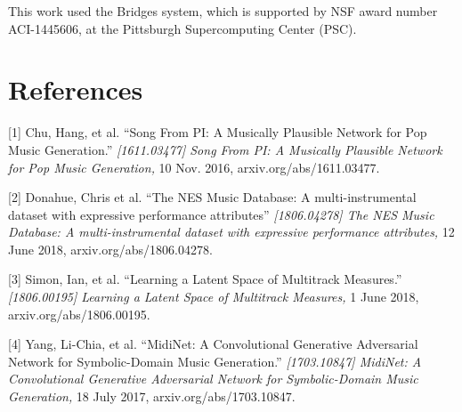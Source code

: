\documentclass{article}
\begin{document}
This work used the Bridges system, which is supported by NSF award number ACI-1445606, at the Pittsburgh Supercomputing Center (PSC).

\section*{References}


\small

[1] Chu, Hang, et al. ``Song From PI: A Musically Plausible Network for Pop Music Generation.'' {\it [1611.03477] Song From PI: A Musically Plausible Network for Pop Music Generation,} 10 Nov. 2016, arxiv.org/abs/1611.03477.

[2] Donahue, Chris et al. ``The NES Music Database: A multi-instrumental dataset with expressive performance attributes'' {\it [1806.04278] The NES Music Database: A multi-instrumental dataset with expressive performance attributes,} 12 June 2018, arxiv.org/abs/1806.04278.

[3] Simon, Ian, et al. ``Learning a Latent Space of Multitrack Measures.'' {\it[1806.00195] Learning a Latent Space of Multitrack Measures,} 1 June 2018, arxiv.org/abs/1806.00195.

[4] Yang, Li-Chia, et al. ``MidiNet: A Convolutional Generative Adversarial Network for Symbolic-Domain Music Generation.'' {\it[1703.10847] MidiNet: A Convolutional Generative Adversarial Network for Symbolic-Domain Music Generation,} 18 July 2017, arxiv.org/abs/1703.10847.
\end{document}

